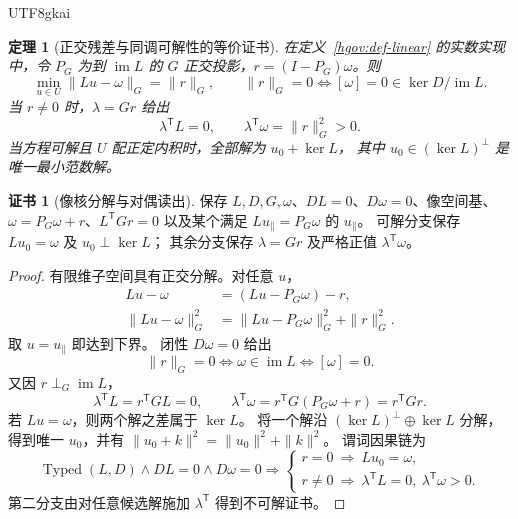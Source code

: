 \documentclass[12pt,a4paper,openany,notitlepage]{report}
\theoremstyle{plain}
\newtheorem{theorem}{定理}[chapter]
\theoremstyle{definition}
\newtheorem*{certificate}{证书}
\theoremstyle{remark}
\begin{document}
\begin{CJK*}{UTF8}{gkai}
\begin{theorem}[正交残差与同调可解性的等价证书]
\label{hgov:thm-projection}
在定义~\ref{hgov:def-linear} 的实数实现中，令 $P_G$ 为到
$\operatorname{im}L$ 的 $G$ 正交投影，$r=(I-P_G)\omega$。则
\[
 \min_{u\in U}\|Lu-\omega\|_G=\|r\|_G,
 \qquad
 \|r\|_G=0
 \Longleftrightarrow
 [\omega]=0\in\ker D/\operatorname{im}L.
\]
当 $r\ne0$ 时，$\lambda=Gr$ 给出
\[
 \lambda^{\mathsf T}L=0,\qquad
 \lambda^{\mathsf T}\omega=\|r\|_G^2>0.
\]
当方程可解且 $U$ 配正定内积时，全部解为 $u_0+\ker L$，
其中 $u_0\in(\ker L)^\perp$ 是唯一最小范数解。
\end{theorem}
\begin{certificate}[像核分解与对偶读出]
保存 $L,D,G,\omega$、$DL=0$、$D\omega=0$、像空间基、
$\omega=P_G\omega+r$、$L^{\mathsf T}Gr=0$ 以及某个满足
$Lu_\parallel=P_G\omega$ 的 $u_\parallel$。
可解分支保存 $Lu_0=\omega$ 及 $u_0\perp\ker L$；
其余分支保存 $\lambda=Gr$ 及严格正值 $\lambda^{\mathsf T}\omega$。
\end{certificate}
\begin{proof}
有限维子空间具有正交分解。对任意 $u$，
\[
 \begin{aligned}
 Lu-\omega&=(Lu-P_G\omega)-r,\\
 \|Lu-\omega\|_G^2
 &=\|Lu-P_G\omega\|_G^2+\|r\|_G^2.
 \end{aligned}
\]
取 $u=u_\parallel$ 即达到下界。
闭性 $D\omega=0$ 给出
\[
 \|r\|_G=0
 \Longleftrightarrow \omega\in\operatorname{im}L
 \Longleftrightarrow[\omega]=0.
\]
又因 $r\perp_G\operatorname{im}L$，
\[
 \lambda^{\mathsf T}L=r^{\mathsf T}GL=0,\qquad
 \lambda^{\mathsf T}\omega
 =r^{\mathsf T}G(P_G\omega+r)=r^{\mathsf T}Gr.
\]
若 $Lu=\omega$，则两个解之差属于 $\ker L$。
将一个解沿 $(\ker L)^\perp\oplus\ker L$ 分解，
得到唯一 $u_0$，并有
$\|u_0+k\|^2=\|u_0\|^2+\|k\|^2$。
谓词因果链为
\[
 \operatorname{Typed}(L,D)\wedge DL=0\wedge D\omega=0
 \Longrightarrow
 \begin{cases}
 r=0\ \Longrightarrow\ Lu_0=\omega,\\
 r\ne0\ \Longrightarrow\
 \lambda^{\mathsf T}L=0,\ \lambda^{\mathsf T}\omega>0.
 \end{cases}
\]
第二分支由对任意候选解施加 $\lambda^{\mathsf T}$ 得到不可解证书。
\end{proof}


\end{CJK*}
\end{document}
